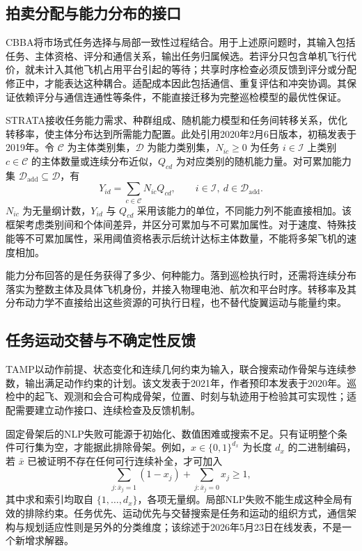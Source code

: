 \subsection{拍卖分配与能力分布的接口}

CBBA将市场式任务选择与局部一致性过程结合\cite{CBBA2009}。用于上述原问题时，其输入包括任务、主体资格、评分和通信关系，输出任务归属候选。若评分只包含单机飞行代价，就未计入其他飞机占用平台引起的等待；共享时序检查必须反馈到评分或分配修正中，才能表达这种耦合。适配成本因此包括通信、重复评估和冲突协调。其保证依赖评分与通信连通性等条件，不能直接迁移为完整巡检模型的最优性保证。

STRATA接收任务能力需求、种群组成、随机能力模型和任务间转移关系，优化转移率，使主体分布达到所需能力配置\cite{STRATA2020}。此处引用2020年2月6日版本，初稿发表于2019年。令 $\mathcal C$ 为主体类别集，$\mathcal D$ 为能力类别集，$N_{ic}\geq0$ 为任务 $i\in\mathcal I$ 上类别 $c\in\mathcal C$ 的主体数量或连续分布近似，$Q_{cd}$ 为对应类别的随机能力量。对可累加能力集 $\mathcal D_{\mathrm{add}}\subseteq\mathcal D$，有
\begin{equation}
\label{s0309:trait_aggregation}
Y_{id}=\sum_{c\in\mathcal C}N_{ic}Q_{cd},
\qquad i\in\mathcal I,\ d\in\mathcal D_{\mathrm{add}}.
\end{equation}
$N_{ic}$ 为无量纲计数，$Y_{id}$ 与 $Q_{cd}$ 采用该能力的单位，不同能力列不能直接相加。该框架考虑类别间和个体间差异，并区分可累加与不可累加属性。对于速度、特殊技能等不可累加属性，采用阈值资格表示后统计达标主体数量，不能将多架飞机的速度相加。

能力分布回答的是任务获得了多少、何种能力。落到巡检执行时，还需将连续分布落实为整数主体及具体飞机身份，并接入物理电池、航次和平台时序。转移率及其分布动力学不直接给出这些资源的可执行日程，也不替代旋翼运动与能量约束。

\subsection{任务运动交替与不确定性反馈}

TAMP以动作前提、状态变化和连续几何约束为输入，联合搜索动作骨架与连续参数，输出满足动作约束的计划\cite{TAMP2021}。该文发表于2021年，作者预印本发表于2020年。巡检中的起飞、观测和会合可构成骨架，位置、时刻与轨迹用于检验其可实现性；适配需要建立动作接口、连续检查及反馈机制。

固定骨架后的NLP失败可能源于初始化、数值困难或搜索不足。只有证明整个条件可行集为空，才能据此排除骨架。例如，$x\in\{0,1\}^{d_x}$ 为长度 $d_x$ 的二进制编码，若 $\bar x$ 已被证明不存在任何可行连续补全，才可加入
\begin{equation}
\label{s0309:nogood}
\sum_{j:\bar x_j=1}(1-x_j)+
\sum_{j:\bar x_j=0}x_j\geq1,
\end{equation}
其中求和索引均取自 $\{1,\ldots,d_x\}$，各项无量纲。局部NLP失败不能生成这种全局有效的排除约束。任务优先、运动优先与交替搜索是任务和运动的组织方式，通信架构与规划适应性则是另外的分类维度\cite{MATAMP2026}；该综述于2026年5月23日在线发表，不是一个新增求解器。

